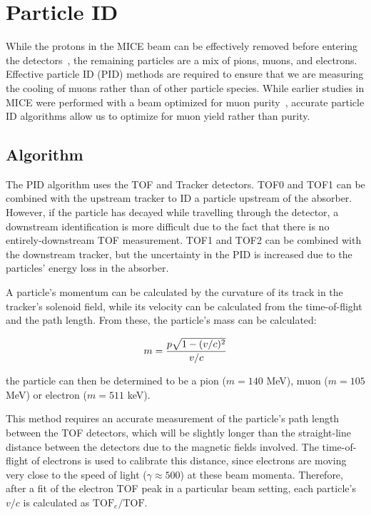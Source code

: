 \graphicspath{{07-PID/Figures/}}

\section{Particle ID}
\label{Sect:PID}

While the protons in the MICE beam can be effectively removed before entering the detectors~\cite{proton_absorber}, the remaining particles are a mix of pions, muons, and electrons.  Effective particle ID (PID) methods are required to ensure that we are measuring the cooling of muons rather than of other particle species.  While earlier studies in MICE were performed with a beam optimized for muon purity~\cite{2016JInst..11P3001A}, accurate particle ID algorithms allow us to optimize for muon yield rather than purity.

\subsection{Algorithm}
\label{SubSect:PID_Algo}

The PID algorithm uses the TOF and Tracker detectors.  TOF0 and TOF1 can be combined with the upstream tracker to ID a particle upstream of the absorber.  However, if the particle has decayed while travelling through the detector, a downstream identification is more difficult due to the fact that there is no entirely-downstream TOF measurement.  TOF1 and TOF2 can be combined with the downstream tracker, but the uncertainty in the PID is increased due to the particles' energy loss in the absorber.

A particle's momentum can be calculated by the curvature of its track in the tracker's solenoid field, while its velocity can be calculated from the time-of-flight and the path length.  From these, the particle's mass can be calculated:

\begin{equation}
\label{eq:pid_mass_calc} m = {p \sqrt{1-(v/c)^2} \over v/c}
\end{equation}

the particle can then be determined to be a pion ($m=140$ MeV), muon ($m=105$ MeV) or electron ($m=511$ keV).

This method requires an accurate measurement of the particle's path length between the TOF detectors, which will be slightly longer than the straight-line distance between the detectors due to the magnetic fields involved.  The time-of-flight of electrons is used to calibrate this distance, since electrons are moving very close to the speed of light ($\gamma \approx 500$) at these beam momenta.  Therefore, after a fit of the electron TOF peak in a particular beam setting, each particle's $v/c$ is calculated as $\mathrm{TOF}_e / \mathrm{TOF}$.

